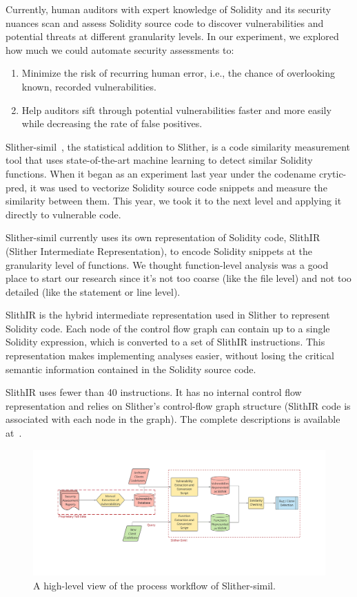 Currently, human auditors with expert knowledge of Solidity and its security nuances scan and assess Solidity source code to discover vulnerabilities and potential threats at different granularity levels.
In our experiment, we explored how much we could automate security assessments to:
\begin{enumerate}
  \item Minimize the risk of recurring human error, i.e., the chance of overlooking known, recorded vulnerabilities.
  \item Help auditors sift through potential vulnerabilities faster and more easily while decreasing the rate of false positives.
\end{enumerate}

Slither-simil~\cite{slithersimil}, the statistical addition to Slither, is a code similarity measurement tool that uses state-of-the-art machine learning to detect similar Solidity functions.
When it began as an experiment last year under the codename crytic-pred, it was used to vectorize Solidity source code snippets and measure the similarity between them.
This year, we took it to the next level and applying it directly to vulnerable code.

Slither-simil currently uses its own representation of Solidity code, SlithIR (Slither Intermediate Representation), to encode Solidity snippets at the granularity level of functions.
We thought function-level analysis was a good place to start our research since it's not too coarse (like the file level) and not too detailed (like the statement or line level).

SlithIR is the hybrid intermediate representation used in Slither to represent Solidity code. Each node of the control flow graph can contain up to a single Solidity expression, which is converted
to a set of SlithIR instructions.
This representation makes implementing analyses easier, without losing the critical semantic information contained in the Solidity source code.

SlithIR uses fewer than 40 instructions. It has no internal control flow representation and relies on Slither's control-flow graph structure (SlithIR code is associated with each node in the graph).
The complete descriptions is available at~\cite{slithir}.

\begin{figure}
  \centering
  \includegraphics[width=\textwidth]{figures/slitherS.png}
  \caption{A high-level view of the process workflow of Slither-simil.}
  \label{fig:slithersimilhighlevel}
\end{figure}

